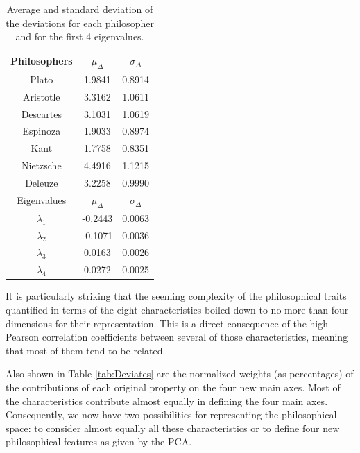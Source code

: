 \documentclass[%
 aip,
 jmp,%
 amsmath,amssymb,
 reprint,%
]{revtex4-1}
\begin{document}
\begin{table}%
\caption{\label{tab:tableD}Average and standard deviation of the 
deviations for each philosopher and for the first 
4 eigenvalues.  }

\begin{tabular}{|c||c|c|}
\hline

Philosophers & $\mu_{\Delta}$ & $\sigma_{\Delta}$ \\
\hline
Plato          & 1.9841 & 0.8914 \\
Aristotle      & 3.3162 & 1.0611 \\
Descartes      & 3.1031 & 1.0619 \\
Espinoza       & 1.9033 & 0.8974 \\
Kant           & 1.7758 & 0.8351 \\
Nietzsche      & 4.4916 & 1.1215 \\
Deleuze        & 3.2258 & 0.9990 \\
\hline \hline
Eigenvalues & $\mu_{\Delta}$ & $\sigma_{\Delta}$ \\
\hline
$\lambda_1$ & -0.2443 & 0.0063 \\
$\lambda_2$ & -0.1071 & 0.0036 \\
$\lambda_3$ &  0.0163 & 0.0026 \\
$\lambda_4$ &  0.0272 & 0.0025 \\
\hline

\end{tabular}
\end{table}

It is particularly striking that the seeming complexity of the
philosophical traits quantified in terms of the eight characteristics
boiled down to no more than four dimensions for their representation.
This is a direct consequence of the high Pearson correlation
coefficients between several of those characteristics, meaning that
most of them tend to be related.

Also shown in Table \ref{tab:Deviates} are the normalized weights (as
percentages) of the contributions of each original property on the four
new main axes.  Most of the characteristics contribute almost equally
in defining the four main axes.  Consequently, we now have two
possibilities for representing the philosophical space: to consider
almost equally all these characteristics or to define four new
philosophical features as given by the PCA.
\end{document}
